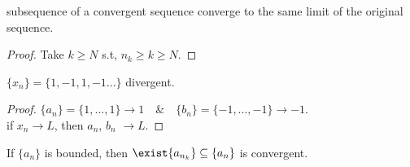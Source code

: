 \begin{theorem}
    subsequence of a convergent sequence converge to the same limit of the original sequence.
\end{theorem}
\begin{proof}
    Take $k\geq N$ s.t, $n_k \geq k \geq N$.
\end{proof}

\begin{example}
$\{x_n\} = \{1,-1, 1, -1...\}$ divergent.

\begin{proof}
$\{a_n\} = \{1,...,1\} \longrightarrow 1 \quad \& \quad \{b_n\} = \{-1,...,-1\} \longrightarrow -1$.\\
if $x_n \longrightarrow L$, then $a_n$, $b_n$  $\longrightarrow L$.
\end{proof}
\end{example}
\begin{theorem}
    If $\{a_n\}$ is bounded, then $\exist \{ a_{n_k} \} \subseteq \{ a_n\}$ is convergent.
\end{theorem}

